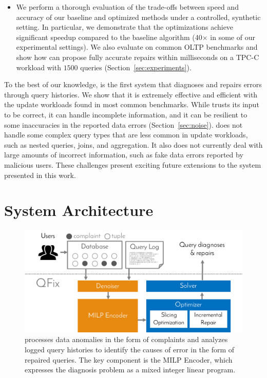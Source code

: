\begin{itemize}[leftmargin=*, topsep=0mm, itemsep=0mm]
    \item We perform a thorough evaluation of the trade-offs between speed and accuracy of our baseline and optimized methods under a controlled, synthetic setting. In particular, we demonstrate that the  \sys optimizations achieve significant speedup compared to the baseline algorithm (40$\times$ in some of our experimental settings).
    We also evaluate \sys on common OLTP benchmarks and show how \sys can propose fully accurate repairs within milliseconds on a TPC-C workload with $1500$ queries (Section~\ref{sec:experiments}).
\end{itemize}

To the best of our knowledge, \sys is the first system that diagnoses
and repairs errors through query histories. We show that it is
extremely effective and efficient with the update workloads found in
most common benchmarks. 
While \sys trusts its input to be correct, it
can handle incomplete information, and it can be resilient to some
inaccuracies in the reported data errors (Section~\ref{sec:noise}).
\sys does not handle some complex query types
that are less common in update workloads, such as nested queries,
joins, and aggregation. 
It also does not currently deal with large amounts of incorrect
information, such as fake data errors reported by malicious users.
These challenges present exciting future extensions to the system presented in this work.






\section{{\sys} System Architecture}



\begin{figure}[t]
    \centering
        \includegraphics[scale=0.35]{figures/architecture}
    \caption{\sys processes data anomalies in the form of complaints and analyzes logged query histories to identify the causes of error in the form of repaired queries. 
    The key component is the MILP Encoder, which expresses the diagnosis problem as a mixed integer linear program.}
    \label{fig:architecture}
\end{figure}


